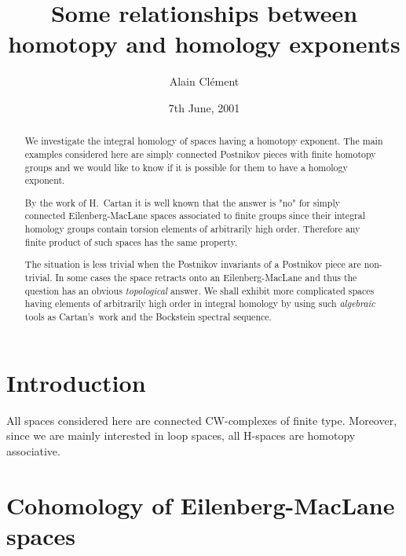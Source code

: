 \documentclass[11pt,a4paper]{amsart}
\theoremstyle{plain}
\theoremstyle{definition}
\theoremstyle{remark}
\begin{document}
\sloppy

\title{Some relationships between\\ homotopy and homology exponents}
\author{Alain Cl\'ement}
\address{Institute of Mathematics, University of Lausanne, CH-1015 Lausanne-Dorigny, Switzerland}
\date{7th June, 2001}

\begin{abstract}
We investigate the integral homology of spaces having a homotopy exponent.
The main examples considered here are simply connected Postnikov pieces with
finite homotopy groups and we would like to know if it is possible for them
to have a homology exponent.

By the work of \mbox{H. Cartan} it is well known that the answer is "no" for
simply connected \mbox{Eilenberg-MacLane} spaces associated to finite groups
since their integral homology groups contain torsion elements of arbitrarily
high order. Therefore any finite product of such spaces has the same
property.

The situation is less trivial when the \mbox{Postnikov} invariants of a
\mbox{Postnikov} piece are non-trivial. In some cases the space retracts
onto an \mbox{Eilenberg-MacLane} and thus the question has an obvious
\mbox{\it topological}  answer. We shall exhibit more complicated spaces
having elements of arbitrarily high order in integral homology by using
such \mbox{\it algebraic} tools as \mbox{Cartan's work} and the Bockstein
spectral sequence.
\end{abstract}

\maketitle

\section{Introduction}
\label{s:intro}

All spaces considered here are connected CW-complexes of finite type. Moreover, since we are mainly interested in loop spaces, all H-spaces are homotopy associative.

\section{Cohomology of Eilenberg-MacLane spaces}
\label{s:cohomology}
\end{document}

